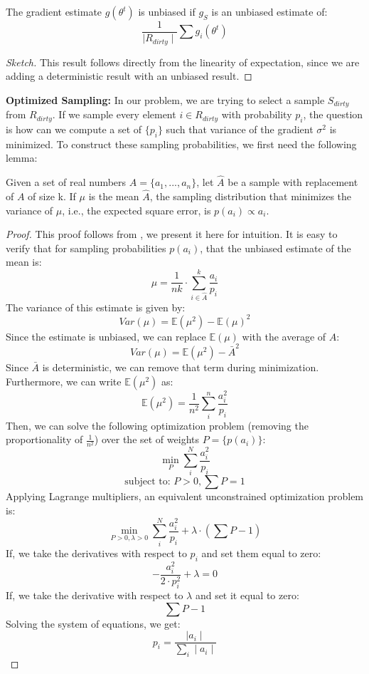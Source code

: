 \begin{lemma}
The gradient estimate $g(\theta^{t})$ is unbiased if $g_S$ is an unbiased estimate of:
\[
\frac{1}{\mid R_{dirty} \mid} \sum g_i(\theta^{t})
\]
\end{lemma}
\begin{proof}[Sketch]
This result follows directly from the linearity of expectation, since we are adding a deterministic result with an unbiased result.
\end{proof}

\vspace{0.5em}

\noindent\textbf{Optimized Sampling: }
In our problem, we are trying to select a sample $S_{dirty}$ from $R_{dirty}$.
If we sample every element $i \in R_{dirty}$ with probability $p_i$, the question is
how can we compute a set of $\{p_i\}$ such that variance of the gradient $\sigma^2$ is minimized.  
To construct these sampling probabilities, we first need the following lemma:
\begin{lemma}\label{impsample}
Given a set of real numbers $A = \{a_1,...,a_n\}$, let $\hat{A}$ be 
a sample with replacement of $A$ of size k.
If $\mu$ is the mean $\hat{A}$, the sampling distribution that minimizes
 the variance of $\mu$, i.e., the expected square error, is $p(a_i) \propto a_i$.
\end{lemma}
\begin{proof}
This proof follows from \cite{mcbook}, we present it here for intuition.
It is easy to verify that for sampling probabilities $p(a_i)$, that the unbiased
estimate of the mean is:
\[
\mu = \frac{1}{nk}\cdot\sum_{i\in\hat{A}}^k \frac{a_i}{p_i}
\]
The variance of this estimate is given by:
\[
Var(\mu) = \mathbb{E}(\mu^2)-\mathbb{E}(\mu)^2
\] 
Since the estimate is unbiased, we can replace $\mathbb{E}(\mu)$ with the average of $A$:
\[
Var(\mu) = \mathbb{E}(\mu^2)-\bar{A}^2
\]
Since $\bar{A}$ is deterministic, we can remove that term during minimization.
Furthermore, we can write $\mathbb{E}(\mu^2)$ as:
\[
\mathbb{E}(\mu^2) = \frac{1}{n^2}\sum_i^n \frac{a_i^2}{p_i}
\]
Then, we can solve the following optimization problem (removing the proportionality of $\frac{1}{n^2}$) over the set of weights $P=\{p(a_i)\}$:
\[
\min_{P} \sum_i^N \frac{a_i^2}{p_i}
\]
\[
\text{subject to: } P > 0, \sum P = 1
\]
Applying Lagrange multipliers, an equivalent unconstrained optimization problem is:
\[
\min_{P > 0,\lambda > 0} \sum_i^N \frac{a_i^2}{p_i} + \lambda \cdot (\sum P - 1)
\]
If, we take the derivatives with respect to $p_i$ and set them equal to zero:
\[
-\frac{a_i^2}{2 \cdot p_i^2} + \lambda = 0
\]
If, we take the derivative with respect to $\lambda$ and set it equal to zero:
\[
\sum P - 1
\]
Solving the system of equations, we get:
\[
p_i = \frac{\mid a_i \mid }{\sum_i \mid a_i \mid}
\]
\end{proof}

